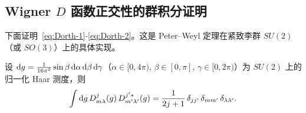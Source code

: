\subsection{Wigner $D$ 函数正交性的群积分证明}
\label{subsec:morespin-Dorth}

下面证明~\eqref{eq:Dorth-1}-\eqref{eq:Dorth-2}。这是 Peter--Weyl 定理在紧致李群 $SU(2)$（或 $SO(3)$）上的具体实现。

\begin{theorem}
\label{thm:morespin-DPW}
设 $\mathrm{d} g=\frac{1}{16\pi^2}\sin\beta\,\mathrm{d}\alpha\,\mathrm{d}\beta\,\mathrm{d}\gamma$（$\alpha\in[0,4\pi)$, $\beta\in[0,\pi]$, $\gamma\in[0,2\pi)$）为 $SU(2)$ 上的归一化 Haar 测度，则
\begin{equation}
\int \mathrm{d} g\, D^{j}_{m\lambda}(g)\,D^{j'*}_{m'\lambda'}(g)
=\frac{1}{2j+1}\,\delta_{jj'}\,\delta_{mm'}\,\delta_{\lambda\lambda'}.
\label{eq:morespin-Dorth-PW}
\end{equation}
\end{theorem}


